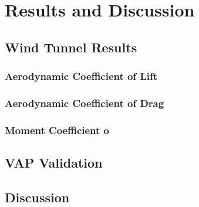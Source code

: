 \graphicspath{{./Figs/}}

\chapter{Results and Discussion} 

\section{Wind Tunnel Results}

\subsection{Aerodynamic Coefficient of Lift}

\subsection{Aerodynamic Coefficient of Drag}

\subsection{Moment Coefficient o}


\section{VAP Validation}


\section{Discussion}